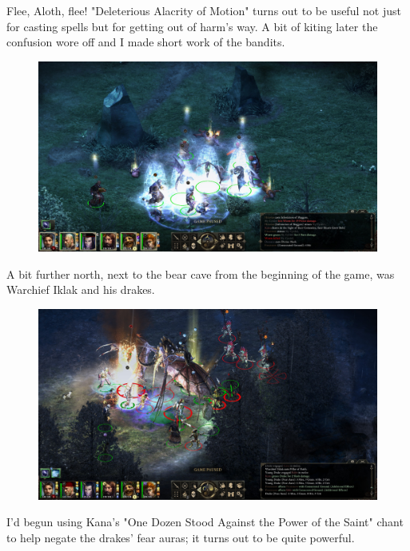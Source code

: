 \documentclass{article}
\begin{document}
Flee, Aloth, flee!  "Deleterious Alacrity of Motion" turns out to be useful not just for casting spells but for getting out of harm's way.  A bit of kiting later the confusion wore off and I made short work of the bandits.

\begin{figure}
\includegraphics[scale=0.33]{files/blog/2018_11_25_pillars_of_eternity_path_of_the_damned_act_ii/2018_11_25_slycidrel_end.jpg}
\end{figure}

A bit further north, next to the bear cave from the beginning of the game, was Warchief Iklak and his drakes.

\begin{figure}
\includegraphics[scale=0.33]{files/blog/2018_11_25_pillars_of_eternity_path_of_the_damned_act_ii/2018_11_25_warchiefiklak_begin.jpg}
\end{figure}

I'd begun using Kana's "One Dozen Stood Against the Power of the Saint" chant to help negate the drakes' fear auras; it turns out to be quite powerful.
\end{document}
